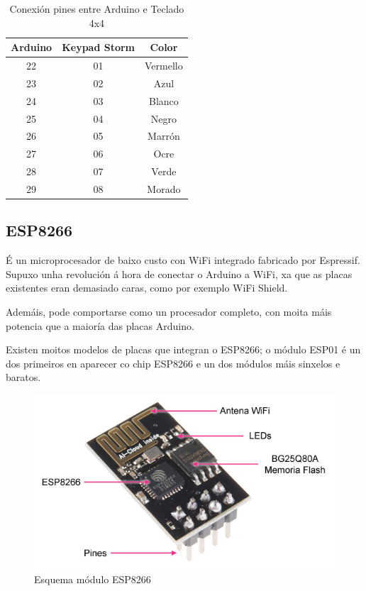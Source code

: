 \documentclass[11pt,twoside]{book}
\begin{document}
\begin{table}[H]
\begin{center}
\begin{tabular}{|c|c|c|}
\hline
Arduino & Keypad Storm & Color \\
\hline
22 & 01 & Vermello \\
\hline
23 & 02 & Azul\\
\hline
24 & 03 & Blanco \\
\hline
25 & 04 & Negro \\
\hline
26 & 05 & Marrón \\
\hline
27 & 06 & Ocre\\
\hline
28 & 07 & Verde \\
\hline
29 & 08 & Morado \\
\hline
\end{tabular}
\caption{Conexión pines entre Arduino e Teclado 4x4}
\label{TablaArduinoKeypad}
\end{center}
\end{table}

\subsection{ESP8266}

É un microprocesador de baixo custo con WiFi integrado fabricado por Espressif. Supuxo unha revolución á hora de conectar o Arduino a WiFi, xa que as placas existentes eran demasiado caras, como por exemplo WiFi Shield.

Ademáis, pode comportarse como un procesador completo, con moita máis potencia que a maioría das placas Arduino.

Existen moitos modelos de placas que integran o ESP8266; o módulo ESP01 é un dos primeiros en aparecer co chip ESP8266 e un dos módulos máis sinxelos e baratos.

\begin{figure}[H]
	\begin{center}
		\includegraphics[width=12cm]{images/esp8266_conexion.jpg}
	\end{center}
	\caption{Esquema módulo ESP8266}
	\label{fig:EsquemaESP8266}
\end{figure}
\end{document}
